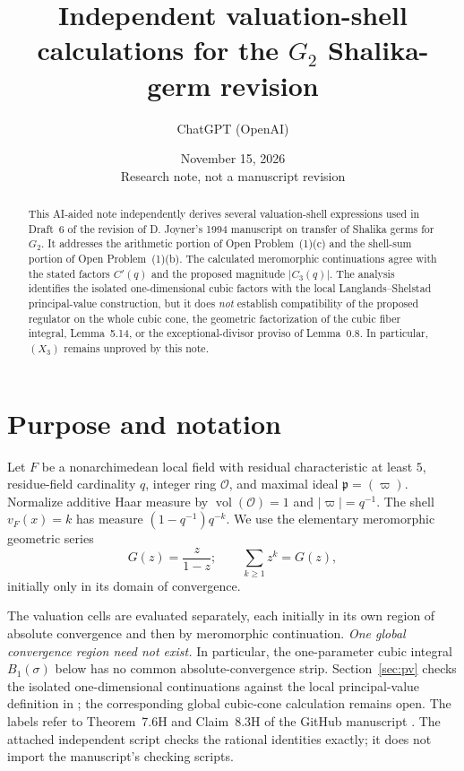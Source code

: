 \documentclass[12pt,letterpaper]{amsart}
\title[Independent shell sums for $G_2$]{Independent valuation-shell calculations for the $G_2$ Shalika-germ revision}
\author{ChatGPT (OpenAI)}
\date{November 15, 2026\\Research note, not a manuscript revision}
\DeclareMathOperator{\vol}{vol}
\begin{document}
\begin{abstract}
This AI-aided note independently derives several valuation-shell expressions used in Draft~6 of the revision of D. Joyner's 1994 manuscript on transfer of Shalika germs for $G_2$. It addresses the arithmetic portion of Open Problem~(1)(c) and the shell-sum portion of Open Problem~(1)(b). The calculated meromorphic continuations agree with the stated factors $C'(q)$ and the proposed magnitude $|C_3(q)|$. The analysis identifies the isolated one-dimensional cubic factors with the local Langlands--Shelstad principal-value construction, but it does \emph{not} establish compatibility of the proposed regulator on the whole cubic cone, the geometric factorization of the cubic fiber integral, Lemma~5.14, or the exceptional-divisor proviso of Lemma~0.8. In particular, $(X_3)$ remains unproved by this note.
\end{abstract}
\maketitle

\section{Purpose and notation}
Let $F$ be a nonarchimedean local field with residual characteristic at least $5$, residue-field cardinality $q$, integer ring $\mathcal O$, and maximal ideal $\mathfrak p=(\varpi)$. Normalize additive Haar measure by $\vol(\mathcal O)=1$ and $|\varpi|=q^{-1}$. The shell $v_F(x)=k$ has measure $(1-q^{-1})q^{-k}$. We use the elementary meromorphic geometric series
\begin{equation}\label{eq:geom}
G(z)=\frac{z}{1-z};\qquad \sum_{k\geq1}z^k=G(z),
\end{equation}
initially only in its domain of convergence.

The valuation cells are evaluated separately, each initially in its own region of absolute convergence and then by meromorphic continuation. \emph{One global convergence region need not exist.} In particular, the one-parameter cubic integral $B_1(\sigma)$ below has no common absolute-convergence strip. Section~\ref{sec:pv} checks the isolated one-dimensional continuations against the local principal-value definition in \cite[\S1]{LS83}; the corresponding global cubic-cone calculation remains open. The labels refer to Theorem~7.6H and Claim~8.3H of the GitHub manuscript \cite{Jo26}. The attached independent script checks the rational identities exactly; it does not import the manuscript's checking scripts.
\end{document}
